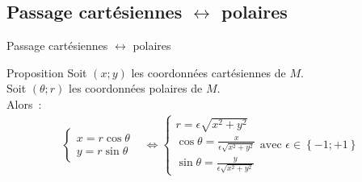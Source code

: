 \documentclass[14pt]{beamer}
\begin{document}
\subsection{Passage cartésiennes $\leftrightarrow$ polaires}
\begin{frame}{Passage cartésiennes $\leftrightarrow$ polaires}
        \begin{alertblock}{Proposition}
                Soit $(x;y)$ les coordonnées cartésiennes de $M$.\\
                Soit $(\theta;r)$ les coordonnées polaires de $M$.\\
                Alors~:
                \begin{align*}
                        \left\{\begin{array}{l}
x=r\cos \theta\\
y=r\sin \theta
                        \end{array}\right. & \Leftrightarrow
                        \left\{\begin{array}{l}
                                r=\epsilon\sqrt{x^2 + y^2}\\
                                \cos\theta=\frac{x}{\epsilon\sqrt{x^2 + y^2}}\\
                                \sin\theta=\frac{y}{\epsilon\sqrt{x^2 + y^2}}
                        \end{array}\right.
                        \text{avec }\epsilon\in\left\{-1;+1\right\}
                \end{align*}
        \end{alertblock}
\end{frame}
\end{document}
